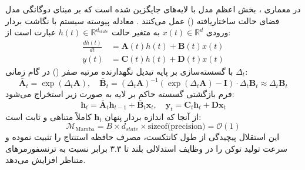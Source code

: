 در معماری ، بخش اعظم مدل با لایه‌های  جایگزین شده است که بر مبنای دوگانگی مدل فضای حالت ساختاریافته () عمل می‌کنند \cite{dao2024transformers}. معادله پیوسته سیستم با نگاشت بردار ورودی $x(t) \in \mathbb{R}^d$ به متغیر حالت $h(t) \in \mathbb{R}^{d_{state}}$ عبارت است از:
\begin{align}
    \frac{dh(t)}{dt} &= \mathbf{A}(t) h(t) + \mathbf{B}(t) x(t) \\
    y(t) &= \mathbf{C}(t) h(t) + \mathbf{D}(t) x(t)
\end{align}
با گسسته‌سازی بر پایه تبدیل نگهدارنده مرتبه صفر () در گام زمانی $\Delta_t$:
\begin{equation}
    \bar{\mathbf{A}}_t = \exp(\Delta_t \mathbf{A}), \quad \bar{\mathbf{B}}_t = (\Delta_t \mathbf{A})^{-1}(\exp(\Delta_t \mathbf{A}) - \mathbf{I}) \cdot \Delta_t \mathbf{B}_t \approx \Delta_t \mathbf{B}_t
\end{equation}
فرم بازگشتی گسسته حاکم بر لایه به صورت زیر استخراج می‌شود:
\begin{equation}
    \mathbf{h}_t = \bar{\mathbf{A}}_t \mathbf{h}_{t-1} + \bar{\mathbf{B}}_t \mathbf{x}_t, \quad \mathbf{y}_t = \mathbf{C}_t \mathbf{h}_t + \mathbf{D} \mathbf{x}_t
\end{equation}
از آنجا که اندازه بردار پنهان $\mathbf{h}_t$ کاملاً متناهی و ثابت است:
\begin{equation}
    \mathcal{M}_{\text{Mamba}} = B \times d_{state} \times \text{sizeof(precision)} = \mathcal{O}(1)
\end{equation}
این استقلال پیچیدگی از طول کانتکست، مصرف حافظه استنتاج را تثبیت نموده و سرعت تولید توکن را در وظایف استدلالی بلند تا ۳.۳ برابر نسبت به ترنسفورمرهای متناظر افزایش می‌دهد.

